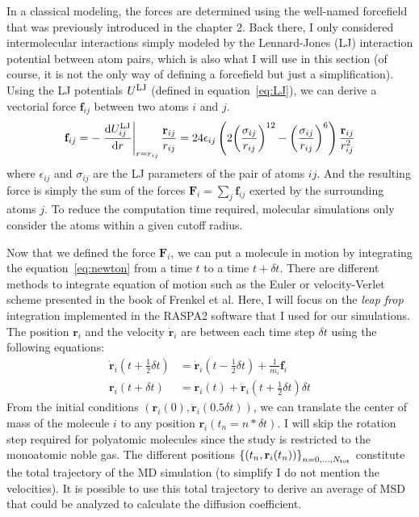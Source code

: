 \documentclass[main]{subfiles}
\begin{document}
In a classical modeling, the forces are determined using the well-named forcefield that was previously introduced in the chapter 2. Back there, I only considered intermolecular interactions simply modeled by the Lennard-Jones (LJ) interaction potential between atom pairs, which is also what I will use in this section (of course, it is not the only way of defining a forcefield but just a simplification). Using the LJ potentials $U^{\text{LJ}}$ (defined in equation~\ref{eq:LJ}), we can derive a vectorial force $\mathbf{f}_{ij}$ between two atoms $i$ and $j$.
\begin{equation}
  \mathbf{f}_{ij} = - \left.{\dfrac{\mathop{}\mathopen{}\mathrm{d} U^{\text{LJ}}_{ij}}{\mathop{}\mathopen{}\mathrm{d} r}}\right\rvert_{r=r_{ij}} \frac{\mathbf{r}_{ij}}{r_{ij}} = 24\epsilon_{ij}  \left(2{\left(\dfrac{\sigma_{ij}}{r_{ij}}\right)}^{12} - {\left(\dfrac{\sigma_{ij}}{r_{ij}}\right)}^{6}\right) \frac{\mathbf{r}_{ij}}{r_{ij}^2}
\end{equation}
where $\epsilon_{ij}$ and $\sigma_{ij}$ are the LJ parameters of the pair of atoms $ij$. And the resulting force is simply the sum of the forces $\mathbf{F}_i=\sum_{j}\mathbf{f}_{ij}$ exerted by the surrounding atoms $j$. To reduce the computation time required, molecular simulations only consider the atoms within a given cutoff radius. 

Now that we defined the force $\mathbf{F}_i$, we can put a molecule in motion by integrating the equation~\ref{eq:newton} from a time $t$ to a time $t+\delta t$. There are different methods to integrate equation of motion such as the Euler or velocity-Verlet scheme presented in the book of Frenkel et al.\autocite{frenkel2001md} Here, I will focus on the \emph{leap frop} integration implemented in the RASPA2\autocite{dubbeldam2016} software that I used for our simulations. The position $\mathbf{r}_i$ and the velocity $\dot{\mathbf{r}}_i$ are between each time step $\delta t$ using the following equations:
\begin{equation}\label{eq:frogleap_integration}
  \begin{split}
    \dot{\mathbf{r}}_i\left(t+\tfrac{1}{2}\delta t\right) & = \dot{\mathbf{r}}_i\left(t-\tfrac{1}{2}\delta t\right) + \tfrac{1}{m_i}\mathbf{f}_i \\
    \mathbf{r}_i\left(t+\delta t\right) & = \mathbf{r}_i\left(t\right) + \dot{\mathbf{r}}_i\left(t+\tfrac{1}{2}\delta t\right)\delta t
  \end{split}
\end{equation}
From the initial conditions $(\mathbf{r}_i(0),\dot{\mathbf{r}}_i(0.5\delta t))$, we can translate the center of mass of the molecule $i$ to any position $\mathbf{r}_i(t_n=n*\delta t)$. I will skip the rotation step required for polyatomic molecules since the study is restricted to the monoatomic noble gas. The different positions ${\left\{\left(t_n,\mathbf{r}_i(t_n)\right)\right\}}_{n=0,\ldots,N_{\text{tot}}}$ constitute the total trajectory of the MD simulation (to simplify I do not mention the velocities). It is possible to use this total trajectory to derive an average of MSD that could be analyzed to calculate the diffusion coefficient.
\end{document}

